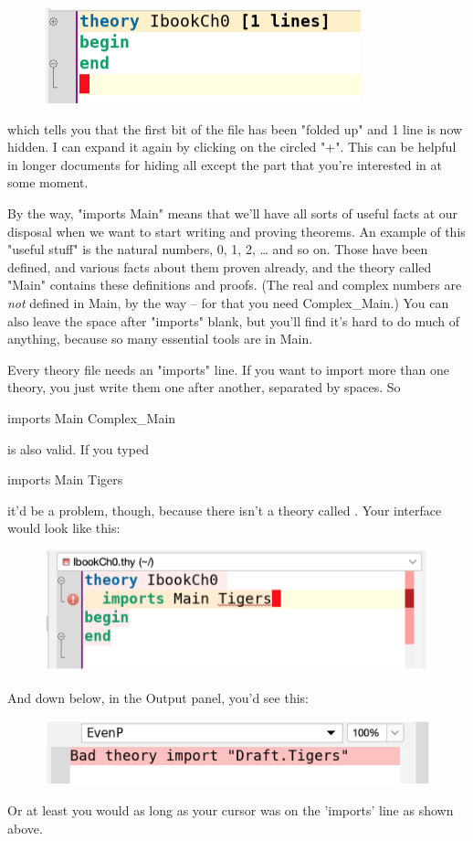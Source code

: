 \begin{figure}[h]
    \centering
    \includegraphics[width=0.5\linewidth]{condensed-theory.png}
    \label{fig:enter-label}
\end{figure}
\noindent which tells you that the first bit of the file has been "folded up" and 1 line is now hidden. I can expand it again by clicking on the circled "+". This can be helpful in longer documents for hiding all except the part that you're interested in at some moment. 

By the way, "imports Main" means that we'll have all sorts of useful facts at our disposal when we want to start writing and proving theorems. An example of this "useful stuff" is the natural numbers, 0, 1, 2, … and so on. Those have been defined, and various facts about them proven already, and the theory called "Main" contains these definitions and proofs. (The real and complex numbers are \textit{not} defined in Main, by the way -- for that you need Complex\_Main.) You can also leave the space after "imports" blank, but you'll find it's hard to do much of anything, because so many essential tools are in Main.

Every theory file needs an "imports" line. If you want to import more than one theory, you just write them one after another, separated by spaces. So 
\begin{IS}    
imports Main Complex\_Main
\end{IS}
\noindent
is also valid. If you typed

\begin{IS}    
imports Main Tigers
\end{IS}    
\noindent
it'd be a problem, though, because there isn't a theory called . Your interface would look like this:
\begin{figure}[h]
    \centering
    \includegraphics[width=0.75\linewidth]{tigers.png}
\end{figure}
And down below, in the Output panel, you'd see this:
\begin{figure}[h]
    \centering
    \includegraphics[width=0.75\linewidth]{tiger-error.png}
\end{figure}
Or at least you would as long as your cursor was on the 'imports' line as shown above. 


